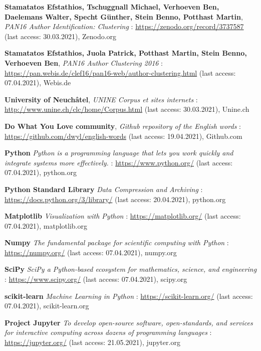 \begin{thebibliography}{9}

\textbf{Stamatatos Efstathios, Tschuggnall Michael, Verhoeven Ben, Daelemans Walter, Specht Günther, Stein Benno, Potthast Martin},
\textit{PAN16 Author Identification: Clustering} : \url{https://zenodo.org/record/3737587} (last access: 30.03.2021),
Zenodo.org

\textbf{Stamatatos Efstathios, Juola Patrick, Potthast Martin, Stein Benno, Verhoeven Ben},
\textit{PAN16 Author Clustering 2016} : \url{https://pan.webis.de/clef16/pan16-web/author-clustering.html} (last access: 07.04.2021),
Webis.de

\textbf{University of Neuchâtel},
\textit{UNINE Corpus et sites internets} : \url{http://www.unine.ch/clc/home/Corpus.html} (last access: 30.03.2021),
Unine.ch

\textbf{Do What You Love community},
\textit{Github repository of the English words} : \url{https://github.com/dwyl/english-words} (last access: 19.04.2021),
Github.com


\textbf{Python}
\textit{Python is a programming language that lets you work quickly and integrate systems more effectively.} : \url{https://www.python.org/} (last access: 07.04.2021),
python.org

\textbf{Python Standard Library}
\textit{Data Compression and Archiving} : \url{https://docs.python.org/3/library/} (last access: 20.04.2021),
python.org

\textbf{Matplotlib}
\textit{Visualization with Python} : \url{https://matplotlib.org/} (last access: 07.04.2021),
matplotlib.org

\textbf{Numpy}
\textit{The fundamental package for scientific computing with Python} : \url{https://numpy.org/} (last access: 07.04.2021),
numpy.org

\textbf{SciPy}
\textit{SciPy a Python-based ecosystem for mathematics, science, and engineering} : \url{https://www.scipy.org/} (last access: 07.04.2021),
scipy.org

\textbf{scikit-learn}
\textit{Machine Learning in Python} : \url{https://scikit-learn.org/} (last access: 07.04.2021),
scikit-learn.org

\textbf{Project Jupyter}
\textit{To develop open-source software, open-standards, and services for interactive computing across dozens of programming languages} : \url{https://jupyter.org/} (last access: 21.05.2021),
jupyter.org


\end{thebibliography}
